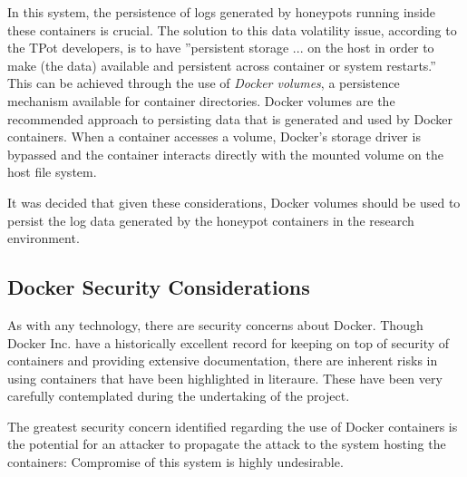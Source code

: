          In this system, the persistence of logs generated by honeypots running inside these containers is crucial. The solution to this data volatility issue, according to the TPot developers, is to have ''persistent storage ... on the host in order to make (the data) available and persistent across container or system restarts.'' \cite{TPotWebpagev16} This can be achieved through the use of \textit{Docker volumes}, a persistence mechanism available for container directories. Docker volumes are the recommended approach to persisting data that is generated and used by Docker containers. When a container accesses a volume, Docker's storage driver is bypassed and the container interacts directly with the mounted volume on the host file system. 
         
         It was decided that given these considerations, Docker volumes should be used to persist the log data generated by the honeypot containers in the research environment.
         
        
    	\subsection{Docker Security Considerations} \label{DockerSecurityConsiderations}
        As with any technology, there are security concerns about Docker. Though Docker Inc. have a historically excellent record for keeping on top of security of containers and providing extensive documentation, \cite{DockerSecurityDocumentation} there are inherent risks in using containers that have been highlighted in literaure. \cite{7742298} \cite{ExperimentingWithDocker} \cite{LXCsForDeceptiveHoneypots2017} \cite{Chelladhurai2016} \cite{Pisarcik:2014:FDV:2659651.2659685} These have been very carefully contemplated during the undertaking of the project.
   
The greatest security concern identified regarding the use of Docker containers is the potential for an attacker to propagate the attack to the system hosting the containers: Compromise of this system is highly undesirable.

